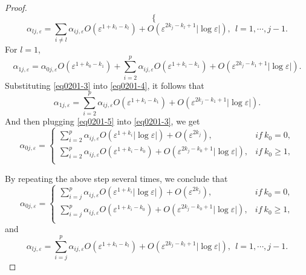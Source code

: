 \documentclass[11pt,reqno]{article}
\numberwithin{equation}{section}
\newcommand\e\varepsilon
\begin{document}
\begin{proof}
\begin{equation}
\begin{cases}
    \end{cases}
\end{equation}
\begin{equation}
    \alpha_{lj,\e}=\sum_{i\neq l}\alpha_{ij,\e}O(\e^{1+{ k_i-k_l}})+O(\e^{2{ k_j}-{ k_l}+1}|\log\e|),\ \ l=1,\cdots,j-1.
\end{equation}
For $l=1$,
\begin{equation}\label{eq0201-4}
    \alpha_{1j,\e}=\alpha_{0j,\e}O(\e^{1+{ k_0-k_1}})+{\sum_{i=2}^{p}}\alpha_{ij,\e}O(\e^{1+{ k_i-k_1}})+O(\e^{2{ k_j}-{ k_1}+1}|\log\e|).
\end{equation}
Substituting \eqref{eq0201-3} into \eqref{eq0201-4}, it follows that
\begin{equation}\label{eq0201-5}
    \alpha_{1j,\e}={ \sum_{i=2}^{p}}\alpha_{ij,\e}O(\e^{1+{ k_i-k_1}})+O(\e^{2{ k_j}-{ k_1}+1}|\log\e|).
\end{equation}
And then plugging \eqref{eq0201-5} into \eqref{eq0201-3}, we get
\begin{equation}\label{eq0201-6}
   \alpha_{0j,\e}=
    \begin{cases}
       \displaystyle{ \sum_{i=2}^{p}}\alpha_{ij,\e}O(\e^{1+{ k_i}}|\log\e|)+O(\e^{2{ k_j}}), &if\ k_0=0,\\
      \displaystyle  { \sum_{i=2}^{p}}\alpha_{ij,\e}O(\e^{1+{ k_i-k_0}})+O(\e^{2{ k_j}-{ k_0}+1}|\log\e|), &if\ k_0\ge 1,\\
    \end{cases}
\end{equation}

By repeating the above step  several times, we conclude that
\begin{equation*}
 \alpha_{0j,\e}=
    \begin{cases}
       \displaystyle{ \sum_{i=j}^{p}}\alpha_{ij,\e}O(\e^{1+{ k_i}}|\log\e|)+O(\e^{2{ k_j}}), &if\ k_0=0,\\
      \displaystyle  { \sum_{i=j}^{p}}\alpha_{ij,\e}O(\e^{1+{ k_i-k_0}})+O(\e^{2{ k_j}-{ k_0}+1}|\log\e|), &if\ k_0\ge 1,\\
    \end{cases}
\end{equation*}
and
\begin{equation*}
    \alpha_{lj,\e}={ \sum_{i=j}^{p}}\alpha_{ij,\e}O(\e^{1+{ k_i-k_l}})+O(\e^{2{ k_j}-{ k_l}+1}|\log\e|),\ \ l=1,\cdots,j-1.
\end{equation*}
\end{proof}
\end{document}
